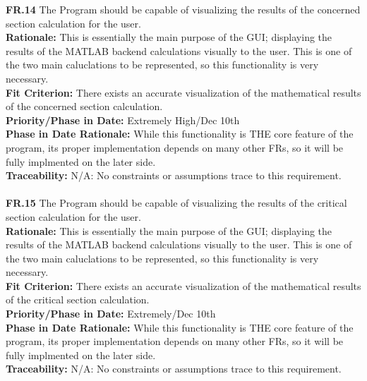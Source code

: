 \documentclass[12pt]{article}
\begin{document}
  \noindent\textbf{FR.14} The Program should be capable of visualizing the results of the concerned section calculation for the user.\\
  \textbf{Rationale:} This is essentially the main purpose of the GUI; displaying the results of the MATLAB backend calculations visually to the user. This is one of the two
  main caluclations to be represented, so this functionality is very necessary.\\
  \textbf{Fit Criterion:} There exists an accurate visualization of the mathematical results of the concerned section calculation.\\
  \textbf{Priority/Phase in Date:} Extremely High/Dec 10th\\
  \textbf{Phase in Date Rationale:} While this functionality is THE core feature of the program, its proper implementation depends on many other FRs, so it will be fully implmented on the later side.\\
  \textbf{Traceability:} N/A: No constraints or assumptions trace to this requirement.\\\\

  \noindent\textbf{FR.15} The Program should be capable of visualizing the results of the critical section calculation for the user.\\
  \textbf{Rationale:} This is essentially the main purpose of the GUI; displaying the results of the MATLAB backend calculations visually to the user. This is one of the two
  main caluclations to be represented, so this functionality is very necessary.\\
  \textbf{Fit Criterion:} There exists an accurate visualization of the mathematical results of the critical section calculation.\\
  \textbf{Priority/Phase in Date:} Extremely/Dec 10th\\
  \textbf{Phase in Date Rationale:} While this functionality is THE core feature of the program, its proper implementation depends on many other FRs, so it will be fully implmented on the later side.\\
  \textbf{Traceability:} N/A: No constraints or assumptions trace to this requirement.\\\\
\end{document}

